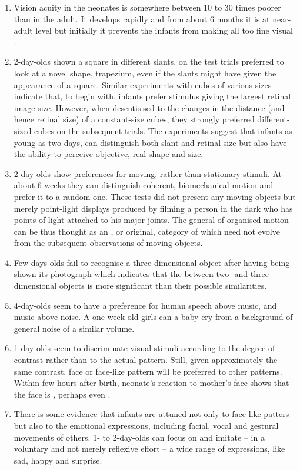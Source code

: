 \begin{enumerate}\MyLPar
\item Vision acuity in the neonates is somewhere between 10 to 30 times poorer
  than in the adult. It develops rapidly and from about 6
  months it is at near-adult level but initially it prevents the infants from
  making all too fine visual .
\item 2-day-olds shown a square in different slants, on the test trials
  preferred to look at a novel shape, trapezium, even if the slants might have
  given the appearance of a square. Similar experiments with
  cubes of various sizes indicate that, to begin with, infants prefer stimulus
  giving the largest retinal image size. However, when desentisised to the
  changes in the distance (and hence retinal size) of a constant-size cubes,
  they strongly preferred different-sized cubes on the subsequent trials. The
  experiments suggest that infants as young as two days, can distinguish both
  slant and retinal size but also have the ability to perceive objective, real
  shape and size.
\item 2-day-olds show preferences for moving, rather than stationary stimuli. At
  about 6 weeks they can distinguish coherent, biomechanical motion and prefer
  it to a random one. These tests did not present any moving objects but merely
  point-light displays produced by filming a person in the dark who has points
  of light attached to his major joints. The general
   of organised motion can be thus thought as an ,
  or original, 
  category of  which need not evolve from the subsequent
  observations of moving objects.
\item Few-days olds fail to recognise a three-dimensional object after having
  being shown its photograph which indicates that the  between
  two- and three-dimensional objects is more significant than their possible
  similarities.
\item 4-day-olds seem to have a preference for human speech above music, and
  music above noise. A one week old girls can
   a baby cry from a background of general noise of a similar
  volume.
\item 1-day-olds seem to discriminate visual stimuli according to the degree of
  contrast rather than to the actual pattern. Still, given
  approximately the same contrast, face or face-like pattern will be preferred
  to other patterns. Within few hours after birth, neonate's reaction to
  mother's face shows that the face is , perhaps even
  .
\item\label{it:comm} There is some evidence that infants are attuned not only to
  face-like patters but also to the emotional expressions, including facial,
  vocal and gestural movements of others. 1- to 2-day-olds
  can focus on and imitate -- in a voluntary and not merely reflexive effort --
  a wide range of expressions, like sad, happy and
  surprise.
  

\end{enumerate}
